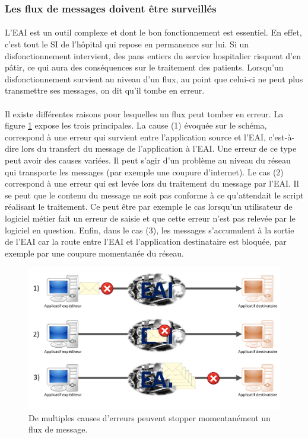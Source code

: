 		\subsubsection{Les flux de messages doivent être surveillés}
			\paragraph{}%
			L'EAI est un outil complexe et dont le bon fonctionnement est essentiel. En
			effet, c'est tout le SI de l'hôpital qui repose en permanence sur lui. Si
			un disfonctionnement intervient, des pans entiers du
			service hospitalier risquent d'en pâtir, ce qui aura des conséquences sur le
			traitement des patients. Lorsqu'un disfonctionnement survient au niveau d'un
			flux, au point que celui-ci ne peut plus transmettre ses messages, on dit
			qu'il tombe en erreur.

			\paragraph{}%
			Il existe différentes raisons pour lesquelles un flux peut tomber en erreur.
			La figure \ref{interop_erreur} expose les trois principales. La cause (1)
			évoquée sur le schéma, correspond à une erreur qui survient entre l'application source et l'EAI,
			c'est-à-dire lors du transfert du message de l'application à l'EAI. Une
			erreur de ce type peut avoir des causes variées. Il peut s'agir d'un problème
			au niveau du réseau qui transporte les messages (par exemple une coupure
			d'internet). Le cas (2) correspond à une erreur qui est levée
			lors du traitement du message par l'EAI. Il se peut que le contenu du
			message ne soit pas conforme à ce qu'attendait le script réalisant le
			traitement. Ce peut être par exemple le cas lorsqu'un utilisateur de
			logiciel métier fait un erreur de saisie et que cette erreur n'est pas
			relevée par le logiciel en question. Enfin, dans le cas (3), les messages
			s'accumulent à la sortie de l'EAI car la route entre l'EAI et l'application
			destinataire est bloquée, par exemple par une coupure momentanée du réseau.
			\newline
			\begin{figure}[H]
				\centering
				\includegraphics[width=15cm]{../img/error_1.png}
				\caption{\label{interop_erreur} De multiples causes d'erreurs peuvent
				stopper momentanément un flux de message.}
			\end{figure}
			
